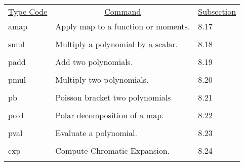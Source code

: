 \begin{center}
\begin{tabular}{lll}
\multicolumn{1}{c}{\underline{Type Code}} &
\multicolumn{1}{c}{\underline{Command}}   &
\multicolumn{1}{c}{\underline{Subsection}} \\
\hspace{1.5em}amap    &     Apply map to a function or moments.  &   \hspace{2em}8.17\\
\vspace{-3mm}& &\\
\hspace{1.5em}smul    &      Multiply a polynomial by a scalar.    & \hspace{2em}8.18\\
\vspace{-3mm}& &\\
\hspace{1.5em}padd    &           Add two polynomials.       &   \hspace{2em}8.19\\
\vspace{-3mm}& &\\
\hspace{1.5em}pmul    &           Multiply two polynomials.   &    \hspace{2em}8.20\\
\vspace{-3mm}& &\\
\hspace{1.5em}pb      &         Poisson bracket two polynomials  &  \hspace{2em}8.21\\
\vspace{-3mm}& &\\
\hspace{1.5em}pold    &           Polar decomposition of a map.  & \hspace{2em}8.22\\
\vspace{-3mm}& &\\
\hspace{1.5em}pval    &           Evaluate a polynomial.       &  \hspace{2em}8.23\\
\vspace{-3mm}& &\\
\hspace{1.5em}cxp    &           Compute Chromatic Expansion.   &  \hspace{2em}8.24\\
\vspace{-3mm}& &\\

\end{tabular}
\end{center}
